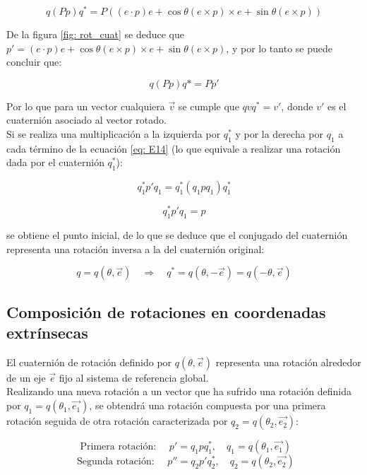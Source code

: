\documentclass[12pt, a4paper]{report}
\begin{document}
$$ q(Pp)q^* = P\left((e \cdot p)e + \cos\theta(e \times p) \times e + \sin\theta(e \times p)\right) $$

De la figura \ref{fig: rot_cuat} se deduce que $ p' = (e \cdot p)e + \cos\theta(e \times p) \times e + \sin\theta(e \times p)$, y por lo tanto se puede concluir que:

$$ q(Pp)q* = Pp' $$

Por lo que para un vector cualquiera $\vec{v}$ se cumple que $qvq^* = v'$, donde $v'$ es el cuaternión asociado al vector rotado. \\

Si se realiza una multiplicación a la izquierda por $q_1^*$ y por la derecha por $q_1$ a cada término de la ecuación \eqref{eq: E14} (lo que equivale a realizar una rotación dada por el cuaternión $q_1^*$):

\begin{equation}
q_1^*p'q_1 = q_1^*(q_1pq_1)q_1^*
\end{equation}

\begin{equation}
q_1^*p'q_1 = p
\end{equation}

se obtiene el punto inicial, de lo que se deduce que el conjugado del cuaternión representa una rotación inversa a la del cuaternión original:

\begin{equation}
q = q\left(\theta, \vec{e} \right) \quad \Rightarrow \quad q^* = q\left(\theta, -\vec{e} \right) = q\left(-\theta, \vec{e}\right)
\end{equation}

\subsection{Composición de rotaciones en coordenadas extrínsecas}

El cuaternión de rotación definido por $q\left(\theta, \vec{e}\right)$ representa una rotación alrededor de un eje $\vec{e}$ fijo al sistema de referencia global.\\

Realizando una nueva rotación a un vector que ha sufrido una rotación definida por $q_1 = q\left(\theta_1, \vec{e_1}\right)$, se obtendrá una rotación compuesta por una primera rotación seguida de otra rotación caracterizada por $q_2 = q\left(\theta_2, \vec{e_2} \right)$:

$$ \text{ Primera rotación: } \quad p' = q_1pq_1^*, \quad q_1 = q(\theta_1, \vec{e_1}) $$
$$ \text{ Segunda rotación: }\quad p'' = q_2p'q_2^*, \quad q_2 = q(\theta_2, \vec{e_2}) $$
\end{document}
